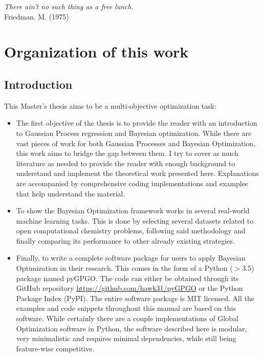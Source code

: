 \documentclass[10pt,a4paper,twoside]{book}
\begin{document}
\clearpage

\cleardoublepage
\thispagestyle{empty}
\begin{flushright}
{\itshape
There ain't no such thing as a free lunch.\\}
Friedman. M. (1975)
\end{flushright}
\cleardoublepage


\tableofcontents


\chapter{Organization of this work}

\section{Introduction}

This Master's thesis aims to be a multi-objective optimization task:

\begin{itemize}
\item The first objective of the thesis is to provide the reader with an introduction to Gaussian Process regression and Bayesian optimization. While there are vast pieces of work for both Gaussian Processes and Bayesian Optimization, this work aims to bridge the gap between them. I try to cover as much literature as needed to provide the reader with enough background to understand and implement the theoretical work presented here. Explanations are accompanied by comprehensive coding implementations and examples that help understand the material.
\item To show the Bayesian Optimization framework works in several real-world machine learning tasks. This is done by selecting several datasets related to open computational chemistry problems, following said methodology and finally comparing its performance to other already existing strategies. 
\item Finally, to write a complete software package for users to apply Bayesian Optimization in their research. This comes in the form of a Python ($>$3.5) package named pyGPGO. The code can either be obtained through its GitHub repository \url{https://github.com/hawk31/pyGPGO} or the Python Package Index (PyPI). The entire software package is MIT licensed. All the examples and code snippets throughout this manual are based on this software. While certainly there are a couple implementations of Global Optimization software in Python, the software described here is modular, very minimalistic and requires minimal dependencies, while still being feature-wise competitive.
\end{itemize}
\end{document}
